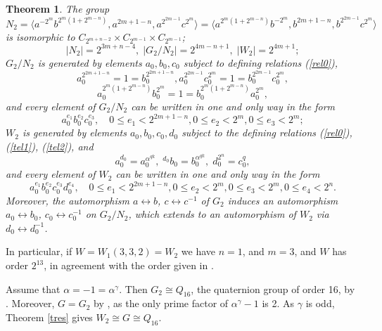 \documentclass{amsart}
\newtheorem{theorem}{Theorem}[section]
\theoremstyle{definition}
\theoremstyle{remark}
\begin{document}
{\begin{theorem}\label{main3} The group
$$
N_2=\langle a^{-2^m}b^{2^{m}(1+2^{m-n})}, a^{2m+1-n}, a^{2^{2m-1}}c^{2^m}\rangle=
\langle a^{2^{m}(1+2^{m-n})}b^{-2^m}, b^{2m+1-n}, b^{2^{2m-1}}c^{2^m}\rangle
$$
is isomorphic to  $C_{2^{m+n-2}}\times C_{2^{m-1}}\times C_{2^{m-1}}$;
$$
|N_2|=2^{3m+n-4},\; |G_2/N_2|=2^{4m-n+1},\; |W_2|=2^{4m+1};
$$
$G_2/N_2$ is generated by elements $a_0,b_0,c_0$ subject to defining relations (\ref{rel0}),
\begin{equation}
\label{tel1}
a_0^{2^{2m+1-n}}=1=b_0^{2^{2m+1-n}}, a_0^{2^{2m-1}}c_0^{2^{m}}=1=b_0^{2^{2m-1}}c_0^{2^{m}},
\end{equation}
\begin{equation}
\label{tel2}
a_0^{2^{m}(1+2^{m-n})}b_0^{2^{m}}=1=b_0^{2^{m}(1+2^{m-n})}a_0^{2^{m}},
\end{equation}
and every element of $G_2/N_2$ can be written in one and only way in the form
\begin{equation}
\label{write3}
a_0^{e_1} b_0^{e_2}c_0^{e_3},\quad 0\leq e_1<2^{2m+1-n}, 0\leq e_2<2^{m}, 0\leq e_3<2^{m};
\end{equation}
$W_2$ is generated by elements $a_0,b_0,c_0,d_0$ subject to the defining relations (\ref{rel0}), (\ref{tel1}), (\ref{tel2}),
and
\begin{equation}
\label{tel3}
a_0^{d_0}=a_0^{\alpha^{qk}},\; {}^{d_0} b_0=b_0^{\alpha^{qk}},\; d_0^{2^n}=c_0^q,
\end{equation}
and every element of $W_2$ can be written in one and only way in the form
$$
a_0^{e_1} b_0^{e_2}c_0^{e_3}d_0^{e_4},\quad 0\leq e_1<2^{2m+1-n}, 0\leq e_2<2^{m}, 0\leq e_3<2^{m}, 0\leq e_4<2^{n}.
$$
Moreover, the automorphism $a\leftrightarrow b$, $c\leftrightarrow c^{-1}$ of $G_2$ induces an automorphism $a_0\leftrightarrow b_0$, 
$c_0\leftrightarrow c_0^{-1}$ on $G_2/N_2$, which extends to an automorphism of $W_2$ via $d_0\leftrightarrow d_0^{-1}$.
\end{theorem}

In particular, if $W=W_1(3,3,2)=W_2$ we have $n=1$, and $m=3$, and $W$ has order $2^{13}$, in agreement with the order
given in \cite{HNO}.

\medskip

 Assume that $\alpha=-1=\alpha^\gamma$.
Then $G_2\cong Q_{16}$, the quaternion group of order 16, by \cite[Proposition 8.2]{MS}. 
Moreover, $G=G_2$ by \cite[Section 4]{M}, as the only prime factor
of $\alpha^\gamma-1$ is 2. As $\gamma$ is odd, Theorem \ref{tres} gives $W_2\cong G\cong Q_{16}$.

}
\end{document}

